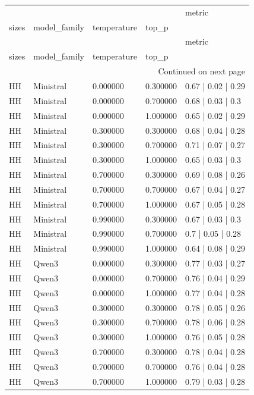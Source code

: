 \begin{longtable}{lllll}
\toprule
 &  &  &  & metric \\
sizes & model_family & temperature & top_p &  \\
\midrule
\endfirsthead
\toprule
 &  &  &  & metric \\
sizes & model_family & temperature & top_p &  \\
\midrule
\endhead
\midrule
\multicolumn{5}{r}{Continued on next page} \\
\midrule
\endfoot
\bottomrule
\endlastfoot
HH & Ministral & 0.000000 & 0.300000 & 0.67 | 0.02 | 0.29 \\
HH & Ministral & 0.000000 & 0.700000 & 0.68 | 0.03 | 0.3 \\
HH & Ministral & 0.000000 & 1.000000 & 0.65 | 0.02 | 0.29 \\
HH & Ministral & 0.300000 & 0.300000 & 0.68 | 0.04 | 0.28 \\
HH & Ministral & 0.300000 & 0.700000 & 0.71 | 0.07 | 0.27 \\
HH & Ministral & 0.300000 & 1.000000 & 0.65 | 0.03 | 0.3 \\
HH & Ministral & 0.700000 & 0.300000 & 0.69 | 0.08 | 0.26 \\
HH & Ministral & 0.700000 & 0.700000 & 0.67 | 0.04 | 0.27 \\
HH & Ministral & 0.700000 & 1.000000 & 0.67 | 0.05 | 0.28 \\
HH & Ministral & 0.990000 & 0.300000 & 0.67 | 0.03 | 0.3 \\
HH & Ministral & 0.990000 & 0.700000 & 0.7 | 0.05 | 0.28 \\
HH & Ministral & 0.990000 & 1.000000 & 0.64 | 0.08 | 0.29 \\
HH & Qwen3 & 0.000000 & 0.300000 & 0.77 | 0.03 | 0.27 \\
HH & Qwen3 & 0.000000 & 0.700000 & 0.76 | 0.04 | 0.29 \\
HH & Qwen3 & 0.000000 & 1.000000 & 0.77 | 0.04 | 0.28 \\
HH & Qwen3 & 0.300000 & 0.300000 & 0.78 | 0.05 | 0.26 \\
HH & Qwen3 & 0.300000 & 0.700000 & 0.78 | 0.06 | 0.28 \\
HH & Qwen3 & 0.300000 & 1.000000 & 0.76 | 0.05 | 0.28 \\
HH & Qwen3 & 0.700000 & 0.300000 & 0.78 | 0.04 | 0.28 \\
HH & Qwen3 & 0.700000 & 0.700000 & 0.76 | 0.04 | 0.28 \\
HH & Qwen3 & 0.700000 & 1.000000 & 0.79 | 0.03 | 0.28 \\

\end{longtable}
